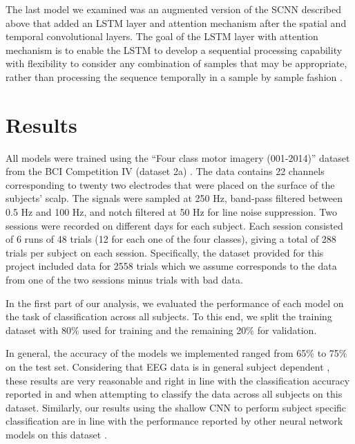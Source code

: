 \documentclass[10pt,twocolumn,letterpaper]{article}
\begin{document}
The last model we examined was an augmented version of the SCNN described above
that added an LSTM layer and attention mechanism after the spatial and temporal
convolutional layers. The goal of the LSTM layer with attention mechanism is to
enable the LSTM to develop a sequential processing capability with flexibility
to consider any combination of samples that may be appropriate, rather than
processing the sequence temporally in a sample by sample fashion
\cite{kostas2019machine}.



\section{Results}
All models were trained using the ``Four class motor imagery (001-2014)''
dataset from the BCI Competition IV (dataset 2a) \cite{brunner2008bci}.
The data contains 22 channels corresponding to twenty two electrodes that were
placed on the surface of the subjects' scalp.
The signals were sampled at 250 Hz, band-pass filtered between 0.5 Hz and 100
Hz, and notch filtered at 50 Hz for line noise suppression.
Two sessions were recorded on different days for each subject. Each session
consisted of 6 runs of 48 trials (12 for each one of the four classes), giving a
total of 288 trials per subject on each session. Specifically, the dataset
provided for this project included data for 2558 trials which we assume
corresponds to the data from one of the two sessions minus trials with bad data.

In the first part of our analysis, we evaluated the performance of each model on
the task of classification across all subjects. To this end, we split the
training dataset with 80\% used for training and the remaining 20\% for
validation.

In general, the accuracy of the models we
implemented ranged from 65\% to 75\% on the test set. Considering that EEG data
is in general subject dependent \cite{wang}, these results are very reasonable
and right in line with the classification accuracy reported in
\cite{kostas2019machine} and \cite{DBLP} when attempting to classify the data
across all subjects on this dataset. Similarly, our results using the shallow
CNN to perform subject specific classification are in line with the performance
reported by other neural network models on this dataset \cite{wang}.
\end{document}
